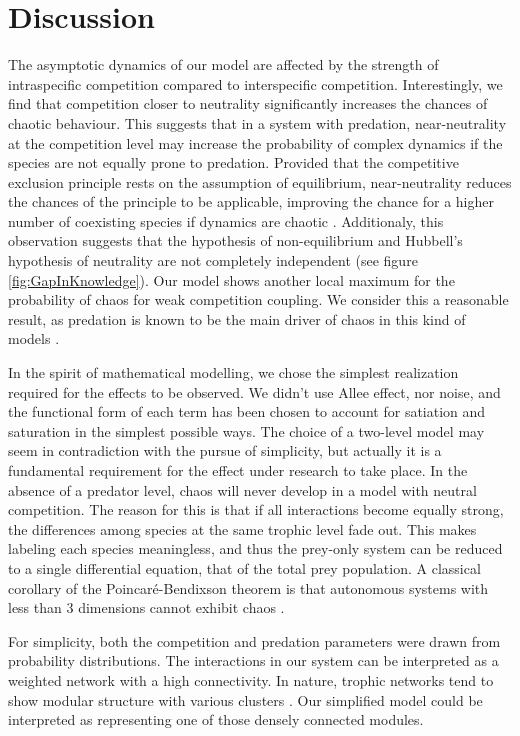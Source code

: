 \section{Discussion}
\label{sec:Discussion}
The asymptotic dynamics of our model are affected by the strength of intraspecific competition compared to interspecific competition. Interestingly, we find that competition closer to neutrality significantly increases the chances of chaotic behaviour. This suggests that in a system with predation, near-neutrality at the competition level may increase the probability of complex dynamics if the species are not equally prone to predation. Provided that the competitive exclusion principle rests on the assumption of equilibrium, near-neutrality reduces the chances of the principle to be applicable, improving the chance for a higher number of coexisting species if dynamics are chaotic \cite{Huisman1999}. Additionaly, this observation suggests that the hypothesis of non-equilibrium and Hubbell's hypothesis of neutrality are not completely independent (see figure \ref{fig:GapInKnowledge}). Our model shows another local maximum for the probability of chaos for weak competition coupling. We consider this a reasonable result, as predation is known to be the main driver of chaos in this kind of models \cite{Scheffer2004}.

In the spirit of mathematical modelling, we chose the simplest realization required for the effects to be observed. We didn't use Allee effect, nor noise, and the functional form of each term has been chosen to account for satiation and saturation in the simplest possible ways. The choice of a two-level model may seem in contradiction with the pursue of simplicity, but actually it is a fundamental requirement for the effect under research to take place. In the absence of a predator level, chaos will never develop in a model with neutral competition. The reason for this is that if all interactions become equally strong, the differences among species at the same trophic level fade out. This makes labeling each species meaningless, and thus the prey-only system can be reduced to a single differential equation, that of the total prey population. A classical corollary of the Poincaré-Bendixson theorem is that autonomous systems with less than $3$ dimensions cannot exhibit chaos \cite{Strogatz1994}.

For simplicity, both the competition and predation parameters were drawn from probability distributions. The interactions in our system can be interpreted as a weighted network with a high connectivity. In nature, trophic networks tend to show modular structure with various clusters \cite{Thebault2010}. Our simplified model could be interpreted as representing one of those densely connected modules.

